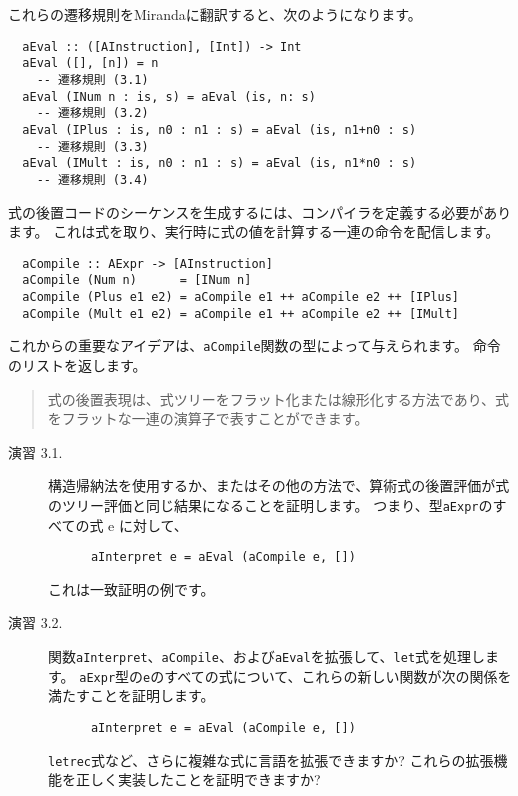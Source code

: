 \documentclass{jarticle}
\begin{document}
これらの遷移規則をMirandaに翻訳すると、次のようになります。

\begin{verbatim}
  aEval :: ([AInstruction], [Int]) -> Int
  aEval ([], [n]) = n
    -- 遷移規則 (3.1)
  aEval (INum n : is, s) = aEval (is, n: s)
    -- 遷移規則 (3.2)
  aEval (IPlus : is, n0 : n1 : s) = aEval (is, n1+n0 : s)
    -- 遷移規則 (3.3)
  aEval (IMult : is, n0 : n1 : s) = aEval (is, n1*n0 : s)
    -- 遷移規則 (3.4)
\end{verbatim}

式の後置コードのシーケンスを生成するには、コンパイラを定義する必要があります。
これは式を取り、実行時に式の値を計算する一連の命令を配信します。

\begin{verbatim}
  aCompile :: AExpr -> [AInstruction]
  aCompile (Num n)      = [INum n]
  aCompile (Plus e1 e2) = aCompile e1 ++ aCompile e2 ++ [IPlus]
  aCompile (Mult e1 e2) = aCompile e1 ++ aCompile e2 ++ [IMult]
\end{verbatim}

これからの重要なアイデアは、\texttt{aCompile}関数の型によって与えられます。
命令のリストを返します。

\begin{quotation}
	式の後置表現は、式ツリーをフラット化または線形化する方法であり、式をフラットな一連の演算子で表すことができます。
\end{quotation}

\begin{description}
	\item[演習 3.1.] 構造帰納法を使用するか、またはその他の方法で、算術式の後置評価が式のツリー評価と同じ結果になることを証明します。
		つまり、型\texttt{aExpr}のすべての式 e に対して、
		\begin{verbatim}
      aInterpret e = aEval (aCompile e, [])
    \end{verbatim}
		これは一致証明の例です。
	\item[演習 3.2.] 関数\texttt{aInterpret}、\texttt{aCompile}、および\texttt{aEval}を拡張して、\texttt{let}式を処理します。
		\texttt{aExpr}型の\texttt{e}のすべての式について、これらの新しい関数が次の関係を満たすことを証明します。
		\begin{verbatim}
      aInterpret e = aEval (aCompile e, [])
    \end{verbatim}
		\texttt{letrec}式など、さらに複雑な式に言語を拡張できますか?
		これらの拡張機能を正しく実装したことを証明できますか?
\end{description}
\end{document}
